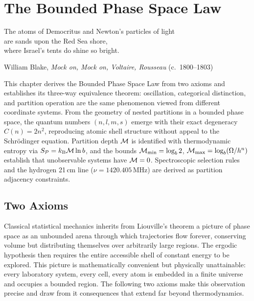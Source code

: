 
\chapter{The Bounded Phase Space Law}
\label{chap:bounded_phase_space}

\epigraph{%
  The atoms of Democritus and Newton's particles of light\\
  are sands upon the Red Sea shore,\\
  where Israel's tents do shine so bright.%
}{William Blake, \textit{Mock on, Mock on, Voltaire, Rousseau} (c.~1800--1803)}

\begin{chapterbox}
This chapter derives the Bounded Phase Space Law from two axioms and establishes
its three-way equivalence theorem: oscillation, categorical distinction, and
partition operation are the same phenomenon viewed from different coordinate
systems. From the geometry of nested partitions in a bounded phase space, the
quantum numbers $(n, l, m, s)$ emerge with their exact degeneracy $C(n) = 2n^2$,
reproducing atomic shell structure without appeal to the Schr\"{o}dinger equation.
Partition depth $\mathcal{M}$ is identified with thermodynamic entropy via
$S_{\mathcal{P}} = k_{\mathrm{B}} \mathcal{M} \ln b$, and the bounds $\mathcal{M}_{\min} = \log_b 2$,
$\mathcal{M}_{\max} = \log_b(\Omega/h^n)$ establish that unobservable systems have
$\mathcal{M} = 0$. Spectroscopic selection rules and the hydrogen 21\,cm line
($\nu = 1420.405$\,MHz) are derived as partition adjacency constraints.
\end{chapterbox}

\section{Two Axioms}
\label{sec:axioms}

Classical statistical mechanics inherits from Liouville's theorem a picture of
phase space as an unbounded arena through which trajectories flow forever,
conserving volume but distributing themselves over arbitrarily large regions.
The ergodic hypothesis then requires the entire accessible shell of constant
energy to be explored. This picture is mathematically convenient but
physically unattainable: every laboratory system, every cell, every atom
is embedded in a finite universe and occupies a bounded region. The following
two axioms make this observation precise and draw from it consequences that
extend far beyond thermodynamics.

